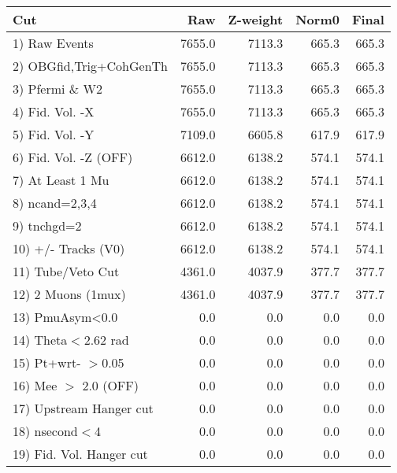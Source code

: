  \begin{table}[h!]\centering
 \begin{tabular}{||l||r|r|r|r||}
 \hline
 \hline
 Cut & Raw & Z-weight & Norm0 & Final \\
 \hline
  1) Raw Events           &      7655.0 &      7113.3 &       665.3 &       665.3 \\
  2) OBGfid,Trig+CohGenTh &      7655.0 &      7113.3 &       665.3 &       665.3 \\
  3) Pfermi \& W2         &      7655.0 &      7113.3 &       665.3 &       665.3 \\
  4) Fid. Vol. -X         &      7655.0 &      7113.3 &       665.3 &       665.3 \\
  5) Fid. Vol. -Y         &      7109.0 &      6605.8 &       617.9 &       617.9 \\
  6) Fid. Vol. -Z (OFF)   &      6612.0 &      6138.2 &       574.1 &       574.1 \\
  7) At Least 1 Mu        &      6612.0 &      6138.2 &       574.1 &       574.1 \\
  8) ncand=2,3,4          &      6612.0 &      6138.2 &       574.1 &       574.1 \\
  9) tnchgd=2             &      6612.0 &      6138.2 &       574.1 &       574.1 \\
 10) +/- Tracks (V0)      &      6612.0 &      6138.2 &       574.1 &       574.1 \\
 11) Tube/Veto Cut        &      4361.0 &      4037.9 &       377.7 &       377.7 \\
 12) 2 Muons (1mux)       &      4361.0 &      4037.9 &       377.7 &       377.7 \\
 13) PmuAsym<0.0          &         0.0 &         0.0 &         0.0 &         0.0 \\
 14) Theta$<$2.62 rad     &         0.0 &         0.0 &         0.0 &         0.0 \\
 15) Pt+wrt- $>$0.05      &         0.0 &         0.0 &         0.0 &         0.0 \\
 16) Mee $>$ 2.0  (OFF)   &         0.0 &         0.0 &         0.0 &         0.0 \\
 17) Upstream Hanger cut  &         0.0 &         0.0 &         0.0 &         0.0 \\
 18) nsecond$<$4          &         0.0 &         0.0 &         0.0 &         0.0 \\
 19) Fid. Vol. Hanger cut &         0.0 &         0.0 &         0.0 &         0.0 \\

\end{tabular}
\end{table}
